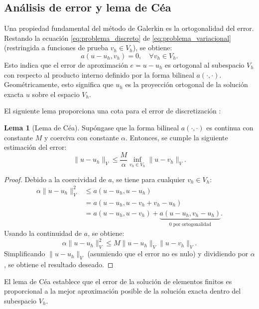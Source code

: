 \documentclass[12pt, letterpaper]{report}
\theoremstyle{definition}
\newtheorem{lema}{Lema}[chapter]
\begin{document}
\subsection{Análisis de error y lema de Céa}

Una propiedad fundamental del método de Galerkin es la ortogonalidad del error. Restando la ecuación \eqref{eq:problema_discreto} de \eqref{eq:problema_variacional} (restringida a funciones de prueba $v_h \in V_h$), se obtiene:
\[
a(u - u_h, v_h) = 0, \quad \forall v_h \in V_h.
\]
Esto indica que el error de aproximación $e = u - u_h$ es ortogonal al subespacio $V_h$ con respecto al producto interno definido por la forma bilineal $a(\cdot,\cdot)$. Geométricamente, esto significa que $u_h$ es la proyección ortogonal de la solución exacta $u$ sobre el espacio $V_h$.

El siguiente lema proporciona una cota para el error de discretización \cite{ciarlet1988mathematical}:

\begin{lema}[Lema de Céa]
    Supóngase que la forma bilineal $a(\cdot,\cdot)$ es continua con constante $M$ y coerciva con constante $\alpha$. Entonces, se cumple la siguiente estimación del error:
    \begin{equation}
        \|u - u_h\|_V \leq \frac{M}{\alpha} \inf_{v_h \in V_h} \|u - v_h\|_V.
    \end{equation}
\end{lema}

\begin{proof}
    Debido a la coercividad de $a$, se tiene para cualquier $v_h \in V_h$:
    \[
    \begin{aligned}
        \alpha \|u - u_h\|_V^2 &\leq a(u - u_h, u - u_h) \\
        &= a(u - u_h, u - v_h + v_h - u_h) \\
        &= a(u - u_h, u - v_h) + \underbrace{a(u - u_h, v_h - u_h)}_{0 \text{ por ortogonalidad}}.
    \end{aligned}
    \]
    Usando la continuidad de $a$, se obtiene:
    \[
    \alpha \|u - u_h\|_V^2 \leq M \|u - u_h\|_V \|u - v_h\|_V.
    \]
    Simplificando $\|u - u_h\|_V$ (asumiendo que el error no es nulo) y dividiendo por $\alpha$, se obtiene el resultado deseado.
\end{proof}

El lema de Céa establece que el error de la solución de elementos finitos es proporcional a la mejor aproximación posible de la solución exacta dentro del subespacio $V_h$.
\end{document}
